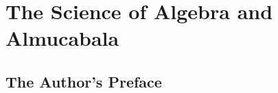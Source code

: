 \documentclass[11pt,a4paper]{book}
\begin{document}
\newpage

\tableofcontents
\newpage

\part{The Science of Algebra and Almucabala}
\label{part:algebra}

\chapter*{The Author's Preface}
\end{document}
